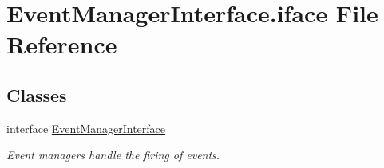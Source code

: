 \hypertarget{EventManagerInterface_8iface}{\section{Event\-Manager\-Interface.\-iface File Reference}
\label{EventManagerInterface_8iface}
}
\subsection*{Classes}
\begin{DoxyCompactItemize}
\item 
interface \hyperlink{interfaceEventManagerInterface}{Event\-Manager\-Interface}
\begin{DoxyCompactList}\small\item\em Event managers handle the firing of events. \end{DoxyCompactList}\end{DoxyCompactItemize}
